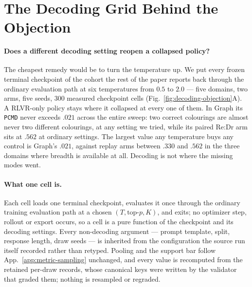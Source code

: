 \documentclass{article}
\newcommand{\1}{\mathbf 1}
\newcommand{\pmd}{\texttt{PCMD}}
\theoremstyle{remark}
\theoremstyle{definition}
\theoremstyle{plain}
\begin{document}
\section{The Decoding Grid Behind the Objection}
\label{app:decoding-objection}

\paragraph{Does a different decoding setting reopen a collapsed policy?}
The cheapest remedy would be to turn the temperature up. We put every frozen
terminal checkpoint of the cohort the rest of the paper reports back through
the ordinary evaluation path at six temperatures from $0.5$ to $2.0$ --- five
domains, two arms, five seeds, 300 measured checkpoint cells
(Fig.~\ref{fig:decoding-objection}A). A RLVR-only policy stays where it
collapsed at every one of them. In Graph its \pmd{} never exceeds $.021$ across
the entire sweep: two correct colourings are almost never two different
colourings, at any setting we tried, while its paired Re:Dr arm sits at $.562$
at ordinary settings. The largest value any temperature buys any control is
Graph's $.021$, against replay arms between $.330$ and $.562$ in the three
domains where breadth is available at all. Decoding is not where the missing
modes went.


\paragraph{What one cell is.}
Each cell loads one terminal checkpoint, evaluates it once through the ordinary
training evaluation path at a chosen $(T,\text{top-}p,K)$, and exits; no
optimizer step, rollout or export occurs, so a cell is a pure function of the
checkpoint and its decoding settings. Every non-decoding argument --- prompt
template, split, response length, draw seeds --- is inherited from the
configuration the source run itself recorded rather than retyped. Pooling and
the support bar follow App.~\ref{app:metric-sampling} unchanged, and every value
is recomputed from the retained per-draw records, whose canonical keys were
written by the validator that graded them; nothing is resampled or regraded.
\end{document}
